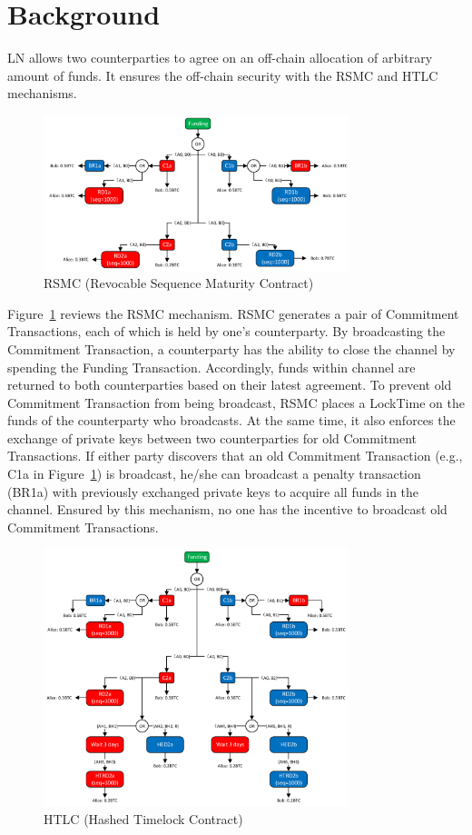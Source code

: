 \section{Background}
\label{sec:problem}

LN allows two counterparties to agree on an off-chain allocation of arbitrary amount of funds. It ensures the off-chain security with the RSMC and HTLC mechanisms.

\begin{figure}[H]
\centering
\includegraphics[width=3.5in]{figs/rsmc_old.pdf}
\vspace{-12pt}
\caption{RSMC (Revocable Sequence Maturity Contract)}
\label{fig:RSMC}
\end{figure}


Figure~\ref{fig:RSMC} reviews the RSMC mechanism. RSMC generates a pair of Commitment Transactions, each of which is held by one's counterparty. By broadcasting the Commitment Transaction, a counterparty has the ability to close the channel by spending the Funding Transaction. Accordingly, funds within channel are returned to both counterparties based on their latest agreement. To prevent old Commitment Transaction from being broadcast, RSMC places a LockTime on the funds of the counterparty who broadcasts. At the same time, it also enforces the exchange of private keys between two counterparties for old Commitment Transactions. If either party discovers that an old Commitment Transaction (e.g., C1a in Figure~\ref{fig:RSMC}) is broadcast, he/she can broadcast a penalty transaction (BR1a) with previously exchanged private keys to acquire all funds in the channel. Ensured by this mechanism, no one has the incentive to broadcast old Commitment Transactions.

\begin{figure}[H]
\centering
\includegraphics[width=3.5in]{figs/htlc_old.pdf}
\vspace{-12pt}
\caption{HTLC (Hashed Timelock Contract)}
\label{fig:htlc}
\end{figure}


